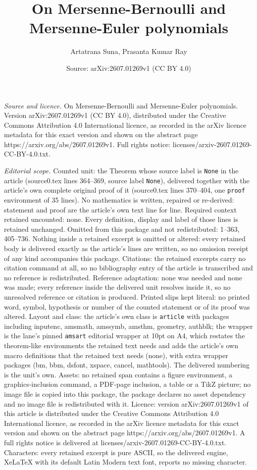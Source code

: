 \documentclass[10pt,a4paper]{amsart}
\title[On Mersenne-Bernoulli and Mersenne-Euler polynomials]{On Mersenne-Bernoulli and Mersenne-Euler polynomials}
\author{Artatrana Suna, Prasanta Kumar Ray}
\date{Source: arXiv:2607.01269v1 (CC BY 4.0)}
\begin{document}
\maketitle

\noindent\emph{Source and licence.} On Mersenne-Bernoulli and Mersenne-Euler polynomials. Version arXiv:2607.01269v1 (CC BY 4.0), distributed under the Creative Commons Attribution 4.0 International licence, as recorded in the arXiv licence metadata for this exact version and shown on the abstract page https://arxiv.org/abs/2607.01269v1. Full rights notice: licenses/arxiv-2607.01269-CC-BY-4.0.txt.\par\smallskip

\noindent\textit{Editorial scope.} Counted unit: the Theorem whose source label is \texttt{None} in the article (source0.tex lines 364--369, source label \texttt{None}), delivered together with the article's own complete original proof of it (source0.tex lines 370--404, one \texttt{proof} environment of 35 lines). No mathematics is written, repaired or re-derived: statement and proof are the article's own text line for line. Required context retained uncounted: none. Every definition, display and label of those lines is retained unchanged. Omitted from this package and not redistributed: 1--363, 405--736. Nothing inside a retained excerpt is omitted or altered: every retained body is delivered exactly as the article's lines are written, so no omission receipt of any kind accompanies this package. Citations: the retained excerpts carry no citation command at all, so no bibliography entry of the article is transcribed and no reference is redistributed. Reference adaptation: none was needed and none was made; every reference inside the delivered unit resolves inside it, so no unresolved reference or citation is produced. Printed slips kept literal: no printed word, symbol, hypothesis or number of the counted statement or of its proof was altered. Layout and class: the article's own class is \texttt{article} with packages including inputenc, amsmath, amssymb, amsthm, geometry, authblk; the wrapper is the lane's pinned \texttt{amsart} editorial wrapper at 10pt on A4, which restates the theorem-like environments the retained text needs and adds the article's own macro definitions that the retained text needs (none), with extra wrapper packages (bm, bbm, dsfont, xspace, cancel, mathtools). The delivered numbering is the unit's own. Assets: no retained span contains a figure environment, a graphics-inclusion command, a PDF-page inclusion, a table or a TikZ picture; no image file is copied into this package, the package declares no asset dependency and no image file is redistributed with it. Licence: version arXiv:2607.01269v1 of this article is distributed under the Creative Commons Attribution 4.0 International licence, as recorded in the arXiv licence metadata for this exact version and shown on the abstract page https://arxiv.org/abs/2607.01269v1. A full rights notice is delivered at licenses/arxiv-2607.01269-CC-BY-4.0.txt. Characters: every retained excerpt is pure ASCII, so the delivered engine, XeLaTeX with its default Latin Modern text font, reports no missing character.
\end{document}

